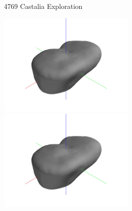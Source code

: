 \begin{frame}{4769 Castalia Exploration}

\begin{center}
    \href{https://youtu.be/EMlYvBGN8S0}{\includegraphics[trim={20cm 10cm 20cm 10cm},clip,keepaspectratio,width=0.5\textwidth,height=\textheight]{figures/computational_geometry/dynamic_exploration/castalia/partial_14998.jpg}}%
        \href{https://youtu.be/jz-_SIi4a5A}{\includegraphics[trim={20cm 10cm 20cm 10cm},clip,keepaspectratio,width=0.5\textwidth,height=\textheight]{figures/computational_geometry/dynamic_exploration/castalia/partial_14998.jpg}}
\end{center}

\end{frame}

